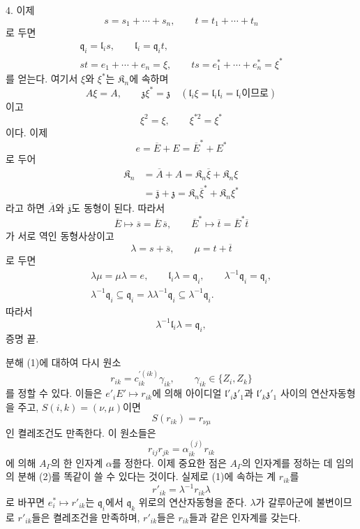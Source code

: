 4. 이제
\[
        s=s_1+\cdots+s_n,
        \qquad
        t=t_1+\cdots+t_n
\]
로 두면
\[
\begin{gathered}
\mathfrak q_i=\mathfrak l_is,
\qquad
\mathfrak l_i=\mathfrak q_it,\\
st=e_1+\cdots+e_n=\xi,
\qquad
ts=e_1^*+\cdots+e_n^*=\xi^*
\end{gathered}
\]
를 얻는다. 여기서 \(\xi\)와 \(\xi^*\)는 \(\mathfrak K_n\)에 속하며
\[
        A\xi=A,
        \qquad
        \mathfrak z\xi^*=\mathfrak z
        \quad
        (\mathfrak l_i\xi
          =\mathfrak l_i\mathfrak l_i
          =\mathfrak l_i\text{이므로})
\]
이고
\[
        \xi^2=\xi,
        \qquad
        \xi^{*2}=\xi^*
\]
이다. 이제
\[
        e=\overline E+E=\overline E^*+E^*
\]
로 두어
\[
\begin{aligned}
\mathfrak K_n
 &=\overline A+A
  =\mathfrak K_n\overline\xi+\mathfrak K_n\xi\\
 &=\overline{\mathfrak z}+\mathfrak z
  =\mathfrak K_n\overline\xi^*+\mathfrak K_n\xi^*
\end{aligned}
\]
라고 하면 \(\overline A\)와 \(\overline{\mathfrak z}\)도 동형이 된다. 따라서
\[
        \overline E\longmapsto
        \overline s=\overline E\,\overline s,
        \qquad
        \overline E^*\longmapsto
        \overline t=\overline E^*\overline t
\]
가 서로 역인 동형사상이고
\[
        \lambda=s+\overline s,
        \qquad
        \mu=t+\overline t
\]
로 두면
\[
\begin{gathered}
\lambda\mu=\mu\lambda=e,
\qquad
\mathfrak l_i\lambda=\mathfrak q_i,
\qquad
\lambda^{-1}\mathfrak q_i=\mathfrak q_i,\\
\lambda^{-1}\mathfrak q_i\subseteq\mathfrak q_i
=\lambda\lambda^{-1}\mathfrak q_i
\subseteq\lambda^{-1}\mathfrak q_i.
\end{gathered}
\]
따라서
\[
        \lambda^{-1}\mathfrak l_i\lambda=\mathfrak q_i,
\]
증명 끝.

분해 (1)에 대하여 다시 원소
\[
        r_{ik}=c_{ik}^{\prime(ik)}\gamma_{ik},
        \qquad
        \gamma_{ik}\in\{Z_i,Z_k\}
\]
를 정할 수 있다. 이들은 \(e'_iE'\mapsto r_{ik}\)에 의해 아이디얼 \(\mathfrak l'_i\mathfrak z'_1\)과 \(\mathfrak l'_k\mathfrak z'_1\) 사이의 연산자동형을 주고, \(S(i,k)=(\nu,\mu)\)이면
\[
        S(r_{ik})=r_{\nu\mu}
\]
인 켤레조건도 만족한다. 이 원소들은
\[
        r_{ij}r_{jk}=\alpha_{ik}^{(j)}r_{ik}
\]
에 의해 \(A_\Gamma\)의 한 인자계 \(\alpha\)를 정한다. 이제 중요한 점은 \(A_\Gamma\)의 인자계를 정하는 데 임의의 분해 (2)를 똑같이 쓸 수 있다는 것이다. 실제로 (1)에 속하는 계 \(r_{ik}\)를
\[
        r'_{ik}=\lambda^{-1}r_{ik}\lambda
\]
로 바꾸면 \(e_i^*\mapsto r'_{ik}\)는 \(\mathfrak q_i\)에서 \(\mathfrak q_k\) 위로의 연산자동형을 준다. \(\lambda\)가 갈루아군에 불변이므로 \(r'_{ik}\)들은 켤레조건을 만족하며, \(r'_{ik}\)들은 \(r_{ik}\)들과 같은 인자계를 갖는다.

